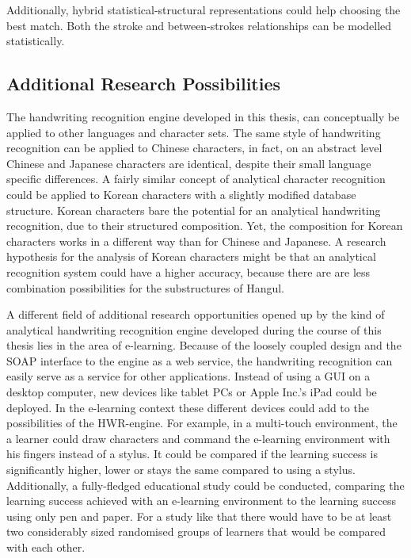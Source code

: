 Additionally, hybrid statistical-structural representations could help choosing
the best match. Both the stroke and between-strokes relationships can be
modelled statistically.


\subsection{Additional Research Possibilities}
\label{sec:conclusion:newresearchpossibilities}
The handwriting recognition engine developed in this thesis, can conceptually
be applied to other languages and character sets.
The same style of handwriting recognition can be applied to Chinese characters, 
in fact, on an abstract level Chinese and Japanese characters are identical,
despite their small language specific differences.
A fairly similar concept of analytical character recognition could be applied 
to Korean characters with a slightly modified database structure.
Korean characters bare the potential for an analytical handwriting recognition,
due to their structured composition. Yet, the composition for Korean characters
works in a different way than for Chinese and Japanese. A research hypothesis
for the analysis of Korean characters might be that an analytical recognition
system could have a higher accuracy, because there are are less combination 
possibilities for the substructures of Hangul.

A different field of additional research opportunities opened up by the
kind of analytical handwriting recognition engine developed during the
course of this thesis lies in the area of e-learning.
Because of the loosely coupled design and the SOAP interface to the engine
as a web service, the handwriting recognition can easily serve as a service 
for other applications. 
Instead of using a GUI on a desktop computer, new devices like tablet PCs or 
Apple Inc.'s iPad could be deployed.
In the e-learning context these different devices could add to the possibilities
of the HWR-engine.
For example, in a multi-touch environment, the a learner could draw characters 
and command the e-learning environment with his fingers instead of a stylus.
It could be compared if the learning success is significantly higher, lower or
stays the same compared to using a stylus.
Additionally, a fully-fledged educational study could be conducted, 
comparing the learning success achieved with an e-learning environment to the 
learning success using only pen and paper.
For a study like that there would have to be at least two considerably sized 
randomised groups of learners that would be compared with each other.

